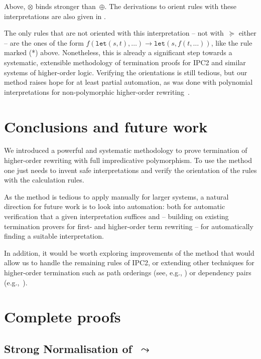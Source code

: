 \documentclass[a4paper,UKenglish,cleveref,autoref,numberwithinsect]{lipics-v2019}
\theoremstyle{definition}
\newcommand{\arrW}{\leadsto}
\newcommand{\red}{\longrightarrow}
\begin{document}
Above, $\otimes$ binds stronger than~$\oplus$. The derivations to
orient rules with these interpretations are also given in
\cite[Appendix~B]{versionwithappendix}.

The only rules that are not oriented with this interpretation -- not
with~$\succeq$ either -- are the ones of the form
$f(\mathtt{let}(s,t), \dots) \red \mathtt{let}(s,f(t,\dots))$, like
the rule marked (*) above. Nonetheless, this is already a significant
step towards a systematic, extensible methodology of termination proofs
for IPC2 and similar systems of higher-order logic. Verifying the
orientations is still tedious, but our method raises hope for at least
partial automation, as was done with polynomial interpretations for
non-polymorphic higher-order rewriting~\cite{FuhsKop2012}.

\section{Conclusions and future work}

We introduced a powerful and systematic methodology to prove
termination of higher-order rewriting with full impredicative
polymorphism. To use the method one just needs to invent safe
interpretations and verify the orientation of the rules with the
calculation rules.

As the method is tedious to apply manually for larger systems, a
natural direction for future work is to look into automation: both for
automatic verification that a given interpretation suffices and --
building on existing termination provers for first- and higher-order
term rewriting -- for automatically finding a suitable interpretation.

In addition, it would be worth exploring improvements of the method
that would allow us to handle the remaining rules of IPC2, or
extending other techniques for higher-order termination such as path
orderings (see, e.g., \cite{jou:rub:99}) or dependency pairs
(e.g.,~\cite{kop:raa:12,suz:kus:bla:11}).



\clearpage
\appendix

\section{Complete proofs}\label{app_proofs}

\subsection{Strong Normalisation of~$\arrW$}
\end{document}
